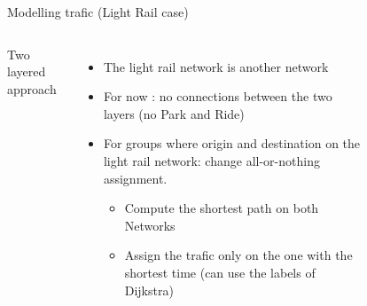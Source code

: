 \documentclass{EESD}
\begin{document}
\begin{frame}{Modelling trafic (Light Rail case)}
	\begin{columns}
		Two layered approach
		\begin{itemize}
			\item The light rail network is another network
			\item For now : no connections between the two layers (no Park and Ride)
			\item<2> For groups where origin and destination on the light rail network: change all-or-nothing assignment. \begin{itemize}
				\item Compute the shortest path on both Networks
				\item Assign the trafic only on the one with the shortest time (can use the labels of Dijkstra)
			\end{itemize}
		\end{itemize}
		\centering
		\begin{figure}
			\centering
			 
\end{figure}
\end{columns}
\end{frame}
\end{document}
